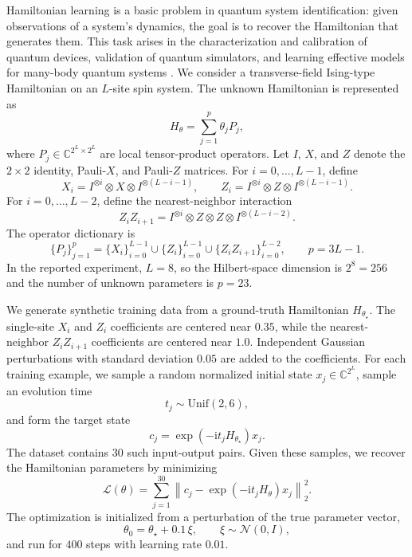 \documentclass{article}
\begin{document}
Hamiltonian learning is a basic problem in quantum system identification: given
observations of a system's dynamics, the goal is to recover the Hamiltonian that
generates them. This task arises in the characterization and calibration of quantum
devices, validation of quantum simulators, and learning effective models for many-body
quantum systems \citep{banchi2023learning,huang2023robust,haah2024practical}. 
We consider a transverse-field Ising-type Hamiltonian on an \(L\)-site spin system. The
unknown Hamiltonian is represented as
\[
    H_\theta = \sum_{j=1}^p \theta_j P_j ,
\]
where \(P_j\in\mathbb{C}^{2^L\times 2^L}\) are local tensor-product operators. Let
\(I\), \(X\), and \(Z\) denote the \(2\times 2\) identity, Pauli-\(X\), and Pauli-\(Z\)
matrices. For \(i=0,\ldots,L-1\), define
\[
    X_i
    =
    I^{\otimes i}\otimes X\otimes I^{\otimes(L-i-1)},
    \qquad
    Z_i
    =
    I^{\otimes i}\otimes Z\otimes I^{\otimes(L-i-1)} .
\]
For \(i=0,\ldots,L-2\), define the nearest-neighbor interaction
\[
    Z_iZ_{i+1}
    =
    I^{\otimes i}\otimes Z\otimes Z\otimes I^{\otimes(L-i-2)} .
\]
The operator dictionary is
\[
    \{P_j\}_{j=1}^p
    =
    \{X_i\}_{i=0}^{L-1}
    \cup
    \{Z_i\}_{i=0}^{L-1}
    \cup
    \{Z_iZ_{i+1}\}_{i=0}^{L-2},
    \qquad
    p=3L-1 .
\]
In the reported experiment, \(L=8\), so the
Hilbert-space dimension is \(2^8=256\) and the number of unknown parameters is
\(p=23\).

We generate synthetic training data from a ground-truth Hamiltonian
\(H_{\theta_\star}\). The single-site \(X_i\) and \(Z_i\) coefficients are centered near
\(0.35\), while the nearest-neighbor \(Z_iZ_{i+1}\) coefficients are centered near
\(1.0\). Independent Gaussian perturbations with standard deviation \(0.05\) are added
to the coefficients. For each training example, we sample a random normalized initial
state \(x_j\in\mathbb{C}^{2^L}\), sample an evolution time
\[
    t_j \sim \mathrm{Unif}(2,6),
\]
and form the target state
\[
    c_j = \exp(-\mathrm{i}t_jH_{\theta_\star})x_j .
\]
The dataset contains \(30\) such input-output pairs. Given these samples, we recover the Hamiltonian parameters by minimizing
\[
    \mathcal{L}(\theta)
    =
    \sum_{j=1}^{30}
    \left\|
        c_j - \exp(-\mathrm{i}t_jH_\theta)x_j
    \right\|_2^2 .
\]
The optimization is initialized from a perturbation of the true parameter vector,
\[
    \theta_0 = \theta_\star + 0.1\,\xi,
    \qquad
    \xi \sim \mathcal{N}(0,I),
\]
and run for \(400\) steps with learning rate \(0.01\).
\end{document}
